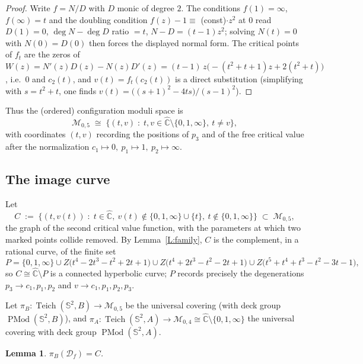 \documentclass[11pt]{amsart}
\newtheorem{lemma}[theorem]{Lemma}
\newcommand{\Sph}{\mathbb{S}^{2}}
\newcommand{\Cpt}{\widehat{\mathbb{C}}}
\newcommand{\Teich}{\operatorname{Teich}}
\newcommand{\PMod}{\operatorname{PMod}}
\newcommand{\Def}{\mathcal{D}}
\begin{document}
\begin{proof}
Write $f=N/D$ with $D$ monic of degree $2$. The conditions
$f(1)=\infty$, $f(\infty)=t$ and the doubling condition
$f(z)-1\equiv$ (const)$\cdot z^2$ at $0$ read $D(1)=0$, $\deg N-\deg D$
ratio $=t$, $N-D=(t-1)z^2$; solving $N(t)=0$ with $N(0)=D(0)$ then forces
the displayed normal form. The critical points of $f_t$ are the zeros of
$W(z)=N'(z)D(z)-N(z)D'(z)=(t-1)\,z\bigl(-(t^2+t+1)z+2(t^2+t)\bigr)$, i.e.\
$0$ and $c_2(t)$, and $v(t)=f_t(c_2(t))$ is a direct substitution
(simplifying with $s=t^2+t$, one finds $v(t)=\bigl((s+1)^2-4ts\bigr)/(s-1)^2$).
\end{proof}

Thus the (ordered) configuration moduli space is
\[
\mathcal{M}_{0,5}\;\cong\;\{(t,v)\;:\;t,v\in\Cpt\setminus\{0,1,\infty\},\ t\neq v\},
\]
with coordinates $(t,v)$ recording the positions of $p_3$ and of the free
critical value after the normalization $c_1\mapsto 0,\ p_1\mapsto 1,\
p_2\mapsto\infty$.

\subsection{The image curve}

Let
\[
C\;:=\;\{(t,v(t))\;:\; t\in \Cpt,\ v(t)\notin\{0,1,\infty\}\cup\{t\},\
t\notin\{0,1,\infty\}\}\;\subset\;\mathcal{M}_{0,5},
\]
the graph of the second critical value function, with the parameters
at which two marked points collide removed. By Lemma~\ref{L:family},
$C$ is the complement, in a rational curve, of the finite set
\[
P=\{0,1,\infty\}\cup Z\bigl(t^4-2t^3-t^2+2t+1\bigr)
\cup Z\bigl(t^4+2t^3-t^2-2t+1\bigr)\cup Z\bigl(t^5+t^4+t^3-t^2-3t-1\bigr),
\]
so $C\cong\Cpt\setminus P$ is a connected hyperbolic curve; $P$ records
precisely the degenerations $p_3\to c_1,p_1,p_2$ and
$v\to c_1,p_1,p_2,p_3$.

Let $\pi_B:\Teich(\Sph,B)\to\mathcal{M}_{0,5}$ be the universal covering
(with deck group $\PMod(\Sph,B)$), and $\pi_A:\Teich(\Sph,A)\to
\mathcal{M}_{0,4}\cong\Cpt\setminus\{0,1,\infty\}$ the universal covering
with deck group $\PMod(\Sph,A)$.

\begin{lemma}\label{L:image}
$\pi_B(\Def_f)=C$.
\end{lemma}
\end{document}
